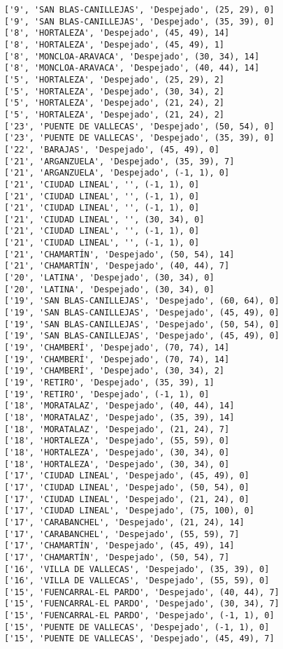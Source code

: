 \documentclass[11pt]{article}
\begin{document}
\begin{Verbatim}[commandchars=\\\{\}]
['9', 'SAN BLAS-CANILLEJAS', 'Despejado', (25, 29), 0]
['9', 'SAN BLAS-CANILLEJAS', 'Despejado', (35, 39), 0]
['8', 'HORTALEZA', 'Despejado', (45, 49), 14]
['8', 'HORTALEZA', 'Despejado', (45, 49), 1]
['8', 'MONCLOA-ARAVACA', 'Despejado', (30, 34), 14]
['8', 'MONCLOA-ARAVACA', 'Despejado', (40, 44), 14]
['5', 'HORTALEZA', 'Despejado', (25, 29), 2]
['5', 'HORTALEZA', 'Despejado', (30, 34), 2]
['5', 'HORTALEZA', 'Despejado', (21, 24), 2]
['5', 'HORTALEZA', 'Despejado', (21, 24), 2]
['23', 'PUENTE DE VALLECAS', 'Despejado', (50, 54), 0]
['23', 'PUENTE DE VALLECAS', 'Despejado', (35, 39), 0]
['22', 'BARAJAS', 'Despejado', (45, 49), 0]
['21', 'ARGANZUELA', 'Despejado', (35, 39), 7]
['21', 'ARGANZUELA', 'Despejado', (-1, 1), 0]
['21', 'CIUDAD LINEAL', '', (-1, 1), 0]
['21', 'CIUDAD LINEAL', '', (-1, 1), 0]
['21', 'CIUDAD LINEAL', '', (-1, 1), 0]
['21', 'CIUDAD LINEAL', '', (30, 34), 0]
['21', 'CIUDAD LINEAL', '', (-1, 1), 0]
['21', 'CIUDAD LINEAL', '', (-1, 1), 0]
['21', 'CHAMARTÍN', 'Despejado', (50, 54), 14]
['21', 'CHAMARTÍN', 'Despejado', (40, 44), 7]
['20', 'LATINA', 'Despejado', (30, 34), 0]
['20', 'LATINA', 'Despejado', (30, 34), 0]
['19', 'SAN BLAS-CANILLEJAS', 'Despejado', (60, 64), 0]
['19', 'SAN BLAS-CANILLEJAS', 'Despejado', (45, 49), 0]
['19', 'SAN BLAS-CANILLEJAS', 'Despejado', (50, 54), 0]
['19', 'SAN BLAS-CANILLEJAS', 'Despejado', (45, 49), 0]
['19', 'CHAMBERÍ', 'Despejado', (70, 74), 14]
['19', 'CHAMBERÍ', 'Despejado', (70, 74), 14]
['19', 'CHAMBERÍ', 'Despejado', (30, 34), 2]
['19', 'RETIRO', 'Despejado', (35, 39), 1]
['19', 'RETIRO', 'Despejado', (-1, 1), 0]
['18', 'MORATALAZ', 'Despejado', (40, 44), 14]
['18', 'MORATALAZ', 'Despejado', (35, 39), 14]
['18', 'MORATALAZ', 'Despejado', (21, 24), 7]
['18', 'HORTALEZA', 'Despejado', (55, 59), 0]
['18', 'HORTALEZA', 'Despejado', (30, 34), 0]
['18', 'HORTALEZA', 'Despejado', (30, 34), 0]
['17', 'CIUDAD LINEAL', 'Despejado', (45, 49), 0]
['17', 'CIUDAD LINEAL', 'Despejado', (50, 54), 0]
['17', 'CIUDAD LINEAL', 'Despejado', (21, 24), 0]
['17', 'CIUDAD LINEAL', 'Despejado', (75, 100), 0]
['17', 'CARABANCHEL', 'Despejado', (21, 24), 14]
['17', 'CARABANCHEL', 'Despejado', (55, 59), 7]
['17', 'CHAMARTÍN', 'Despejado', (45, 49), 14]
['17', 'CHAMARTÍN', 'Despejado', (50, 54), 7]
['16', 'VILLA DE VALLECAS', 'Despejado', (35, 39), 0]
['16', 'VILLA DE VALLECAS', 'Despejado', (55, 59), 0]
['15', 'FUENCARRAL-EL PARDO', 'Despejado', (40, 44), 7]
['15', 'FUENCARRAL-EL PARDO', 'Despejado', (30, 34), 7]
['15', 'FUENCARRAL-EL PARDO', 'Despejado', (-1, 1), 0]
['15', 'PUENTE DE VALLECAS', 'Despejado', (-1, 1), 0]
['15', 'PUENTE DE VALLECAS', 'Despejado', (45, 49), 7]

\end{Verbatim}
\end{document}
